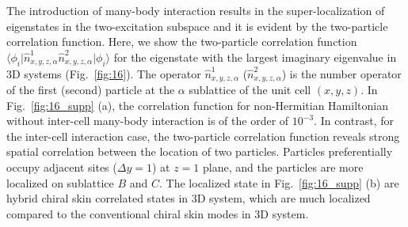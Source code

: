 \documentclass[longbibliography, aps, prx, amsmath, amssymb, amsfonts, twocolumn,superscriptaddress, footinbib]{revtex4-1}
\begin{document}
	The introduction of many-body interaction results in the super-localization of eigenstates in the two-excitation subspace and it is evident by the two-particle correlation function. 
	Here, we show the two-particle correlation function $\langle \phi_i \vert \hat{n}^1_{x,y,z,\alpha} \hat{n}^2_{x,y,z,\alpha} \vert \phi_i \rangle$ for the eigenstate with the largest imaginary eigenvalue in 3D systems (Fig.~\ref{fig:16}). The operator $\hat{n}^1_{x,y,z,\alpha}$ ($\hat{n}^2_{x,y,z,\alpha}$) is the number operator of the first (second) particle at the $\alpha$ sublattice of the unit cell $(x,y,z)$.
	In Fig.~\ref{fig:16_supp} (a), the correlation function for non-Hermitian Hamiltonian without inter-cell many-body interaction is of the order of $10^{-3}$. In contrast, for the inter-cell interaction case, the two-particle correlation function reveals strong spatial correlation between the location of two particles. {} 
	Particles preferentially occupy adjacent sites ($\Delta y =1$) at $z=1$ plane, and the particles are more localized on sublattice $B$ and $C$. 
	The localized state in Fig.~\ref{fig:16_supp} (b) are hybrid chiral skin correlated states in 3D system, which are much localized compared to the conventional chiral skin modes in 3D system.
\end{document}
